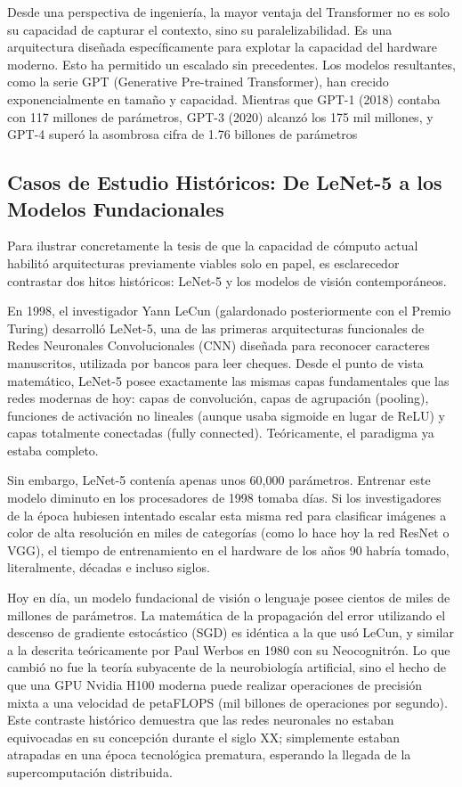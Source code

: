 \documentclass[12pt,a4paper]{article}
\begin{document}
Desde una perspectiva de ingeniería, la mayor ventaja del Transformer no es solo su capacidad de capturar el contexto, sino su paralelizabilidad. Es una arquitectura diseñada específicamente para explotar la capacidad del hardware moderno. Esto ha permitido un escalado sin precedentes. Los modelos resultantes, como la serie GPT (Generative Pre-trained Transformer), han crecido exponencialmente en tamaño y capacidad. Mientras que GPT-1 (2018) contaba con 117 millones de parámetros, GPT-3 (2020) alcanzó los 175 mil millones, y GPT-4 superó la asombrosa cifra de 1.76 billones de parámetros

\subsection{Casos de Estudio Históricos: De LeNet-5 a los Modelos Fundacionales}
Para ilustrar concretamente la tesis de que la capacidad de cómputo actual habilitó arquitecturas previamente viables solo en papel, es esclarecedor contrastar dos hitos históricos: LeNet-5 y los modelos de visión contemporáneos. 

En 1998, el investigador Yann LeCun (galardonado posteriormente con el Premio Turing) desarrolló LeNet-5, una de las primeras arquitecturas funcionales de Redes Neuronales Convolucionales (CNN) diseñada para reconocer caracteres manuscritos, utilizada por bancos para leer cheques. Desde el punto de vista matemático, LeNet-5 posee exactamente las mismas capas fundamentales que las redes modernas de hoy: capas de convolución, capas de agrupación (pooling), funciones de activación no lineales (aunque usaba sigmoide en lugar de ReLU) y capas totalmente conectadas (fully connected). Teóricamente, el paradigma ya estaba completo. 

Sin embargo, LeNet-5 contenía apenas unos 60,000 parámetros. Entrenar este modelo diminuto en los procesadores de 1998 tomaba días. Si los investigadores de la época hubiesen intentado escalar esta misma red para clasificar imágenes a color de alta resolución en miles de categorías (como lo hace hoy la red ResNet o VGG), el tiempo de entrenamiento en el hardware de los años 90 habría tomado, literalmente, décadas e incluso siglos.

Hoy en día, un modelo fundacional de visión o lenguaje posee cientos de miles de millones de parámetros. La matemática de la propagación del error utilizando el descenso de gradiente estocástico (SGD) es idéntica a la que usó LeCun, y similar a la descrita teóricamente por Paul Werbos en 1980 con su Neocognitrón. Lo que cambió no fue la teoría subyacente de la neurobiología artificial, sino el hecho de que una GPU Nvidia H100 moderna puede realizar operaciones de precisión mixta a una velocidad de petaFLOPS (mil billones de operaciones por segundo). Este contraste histórico demuestra que las redes neuronales no estaban equivocadas en su concepción durante el siglo XX; simplemente estaban atrapadas en una época tecnológica prematura, esperando la llegada de la supercomputación distribuida.
\end{document}
